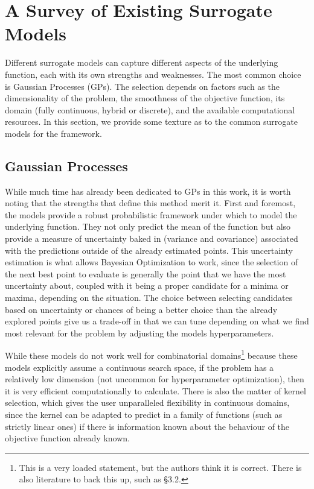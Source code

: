 \section{A Survey of Existing Surrogate Models}

Different surrogate models can capture different aspects of the underlying function, each with its own strengths and weaknesses. The most common choice is Gaussian Processes (GPs). The selection depends on factors such as the dimensionality of the problem, the smoothness of the objective function, its domain (fully continuous, hybrid or discrete), and the available computational resources. In this section, we provide some texture as to the common surrogate models for the framework. 

\subsection{Gaussian Processes}
While much time has already been dedicated to GPs in this work, it is worth noting that the strengths that define this method merit it. First and foremost, the models provide a robust probabilistic framework under which to model the underlying function. They not only predict the mean of the function but also provide a measure of uncertainty baked in (variance and covariance) associated with the predictions outside of the already estimated points. This uncertainty estimation is what allows Bayesian Optimization to work, since the selection of the next best point to evaluate is generally the point that we have the most uncertainty about, coupled with it being a proper candidate for a minima or maxima, depending on the situation. The choice between selecting candidates based on uncertainty or chances of being a better choice than the already explored points give us a trade-off in that we can tune depending on what we find most relevant for the problem by adjusting the models hyperparameters. 

While these models do not work well for combinatorial domains\footnote{This is a very loaded statement, but the authors think it is correct. There is also literature to back this up, such as \cite{wang2023recent} \S 3.2.} because these models explicitly assume a continuous search space, if the problem has a relatively low dimension (not uncommon for hyperparameter optimization), then it is very efficient computationally to calculate. There is also the matter of kernel selection, which gives the user unparalleled flexibility in continuous domains, since the kernel can be adapted to predict in a family of functions (such as strictly linear ones) if there is information known about the behaviour of the objective function already known. 

